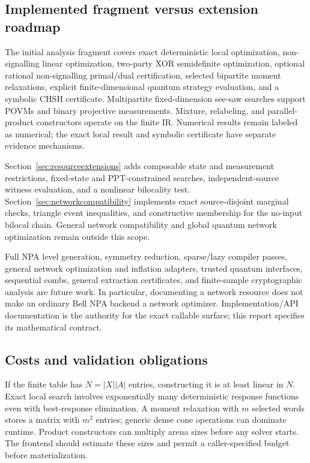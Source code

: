 \subsection{Implemented fragment versus extension roadmap}
The initial analysis fragment covers exact deterministic local optimization,
non-signalling linear optimization, two-party XOR semidefinite optimization,
optional rational non-signalling primal/dual certification,
selected bipartite moment relaxations, explicit finite-dimensional quantum
strategy evaluation, and a symbolic CHSH certificate. Multipartite
fixed-dimension see-saw searches support POVMs and binary projective measurements. Mixture, relabeling,
and parallel-product constructors operate on the finite IR. Numerical results
remain labeled as numerical; the exact local result and symbolic certificate
have separate evidence mechanisms.

Section~\ref{sec:resourceextensions} adds composable state and measurement
restrictions, fixed-state and PPT-constrained searches, independent-source
witness evaluation, and a nonlinear bilocality test. Section~\ref{sec:networkcompatibility}
implements exact source-disjoint marginal checks, triangle event inequalities,
and constructive membership for the no-input bilocal chain. General network
compatibility and global quantum network optimization remain outside this scope.

Full NPA level generation, symmetry reduction, sparse/lazy
compiler passes, general network optimization and inflation adapters, trusted quantum interfaces,
sequential combs, general extraction certificates, and finite-sample
cryptographic analysis are future work. In particular, documenting a network
resource does not make an ordinary Bell NPA backend a network optimizer.
Implementation/API documentation is the authority for the exact callable
surface; this report specifies its mathematical contract.

\subsection{Costs and validation obligations}
If the finite table has $N=|X||A|$ entries, constructing it is at least linear
in $N$. Exact local search involves exponentially many deterministic response
functions even with best-response elimination. A moment relaxation with $m$
selected words stores a matrix with $m^2$ entries; generic dense cone
operations can dominate runtime. Product constructors can multiply arena
sizes before any solver starts. The frontend should estimate these sizes and
permit a caller-specified budget before materialization.

